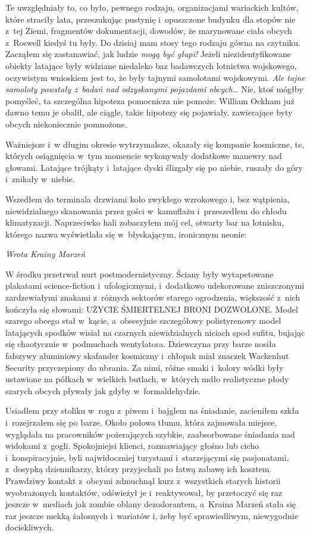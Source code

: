 \documentclass[oneside,polish,12pt,sfheadings]{mwbk}
\begin{document}
Te uwzględniały to, co było, pewnego rodzaju, organizacjami wariackich
kultów, które straciły lata, przeszukując pustynię i~opuszczone budynku
dla stopów nie z~tej Ziemi, fragmentów dokumentacji, dowodów, że
marynowane ciała obcych z~Roswell kiedyś tu były. Do dzisiaj mam stosy
tego rodzaju gówna na czytniku. Zacząłem się zastanawiać, jak ludzie
\emph{mogą być głupi! } Jeżeli niezidentyfikowane obiekty latające były
widziane niedaleko baz badawczych lotnictwa wojskowego, oczywistym
wnioskiem jest to, że były tajnymi samolotami wojskowymi. \emph{Ale
tajne samoloty powstały z~badań nad odzyskanymi pojazdami obcych\ldots
} Nie, ktoś mógłby pomyśleć, ta szczególna hipoteza pomocnicza nie
pomoże. William Ockham już dawno temu je obalił, ale ciągle, takie
hipotezy się pojawiały, zawierające byty obcych niekoniecznie pomnożone.


Ważniejsze i~w długim okresie wytrzymalsze, okazały się kompanie
kosmiczne, te, których osiągnięcia w~tym momencie wykonywały dodatkowe
manewry nad głowami. Latające trójkąty i~latające dyski ślizgały się po
niebie, ruszały do góry i~znikały w~niebie.

Wszedłem do terminala drzwiami koło zwykłego wzrokowego i, bez
wątpienia, niewidzialnego skanowania przez gości w~kamuflażu i~przeszedłem do chłodu klimatyzacji. Naprzeciwko hali zobaczyłem mój cel,
otwarty bar na lotnisku, którego nazwa wyświetlała się w~błyskającym,
ironicznym neonie:

\emph{Wrota Krainy Marzeń}

W środku przetrwał nurt postmodernistyczny. Ściany były wytapetowane
plakatami science-fiction i~ufologicznymi, i~dodatkowo udekorowane
zniszczonymi zardzewiałymi znakami z~różnych sektorów starego
ogrodzenia, większość z~nich kończyła się słowami: UŻYCIE ŚMIERTELNEJ
BRONI DOZWOLONE. Model szarego obcego stał w~kącie, a~obsesyjnie
szczegółowy polistyrenowy model latających spodków wisiał na czarnych
niewidzialnych niciach spod sufitu, bujając się chaotycznie w~podmuchach
wentylatora. Dziewczyna przy barze nosiła fałszywy aluminiowy skafander
kosmiczny i~chłopak miał znaczek Wackenhut Security przyczepiony do
ubrania. Za nimi, różne smaki i~kolory wódki były ustawione na półkach w~wielkich butlach, w~których mdło realistyczne płody szarych obcych
pływały jak gdyby w~formaldehydzie.

Usiadłem przy stoliku w~rogu z~piwem i~bajglem na śniadanie, zacieniłem
szkła i~rozejrzałem się po barze. Około połowa tłumu, która zajmowała
miejsce, wyglądała na pracowników pożerających szybkie, zaabsorbowane
śniadania nad widokami z~gogli. Spokojniejsi klienci, rozmawiający
głośno lub cicho i~konspiracyjnie, byli najwidoczniej turystami i~starzejącymi się pasjonatami, z~dosypką dziennikarzy, którzy przyjechali
po łatwą zabawę ich kosztem. Prawdziwy kontakt z~obcymi zdmuchnął kurz z~wszystkich starych historii wyobrażonych kontaktów, odświeżył je i~reaktywował, by przetoczyć się raz jeszcze w~mediach jak zombie oblany
dezodorantem, a~Kraina Marzeń stała się raz jeszcze mekką żałosnych i~wariatów i, żeby być sprawiedliwym, niewygodnie dociekliwych.
\end{document}
